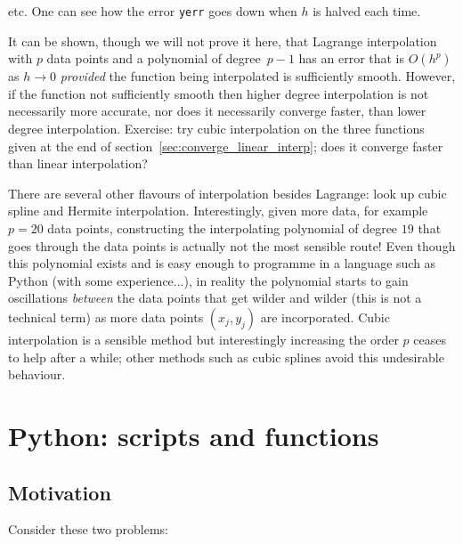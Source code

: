 \noindent
etc. One can see how the error {\tt yerr} goes down when $h$ is halved each time. %


It can be shown, though we will not prove it here, that Lagrange interpolation
with $p$ data points and a polynomial of degree~$p-1$ has an error that is $O(h^{p})$ as $h \rightarrow 0$
\textit{provided} the function being interpolated is sufficiently smooth. However,
if the function not sufficiently smooth then higher degree interpolation is not
necessarily more accurate, nor does it necessarily converge faster, than lower
degree interpolation. Exercise: try cubic interpolation on the three functions
given at the end of
section~\ref{sec:converge_linear_interp}; does it converge faster than linear
interpolation?

There are several other flavours of interpolation besides Lagrange: look up
cubic spline and Hermite interpolation. Interestingly, given more data, for example
$p=20$ data points, constructing the interpolating 
%
%
%
polynomial of degree $19$ that goes through the data points is actually not the most sensible route!
Even though this polynomial exists and is easy
enough to programme in a language such as Python (with some experience...), in reality the polynomial 
starts to gain oscillations \emph{between} the data points that get wilder and wilder (this is not a 
technical term) as more data points $(x_j,y_j)$ are incorporated. Cubic interpolation is a sensible method but
interestingly increasing the order $p$ ceases to help after a while; other methods such as cubic splines
avoid this undesirable behaviour. 


\section{Python: scripts and functions}

\subsection{Motivation}
\label{sec:motivation_two_problems}

Consider these two problems:

